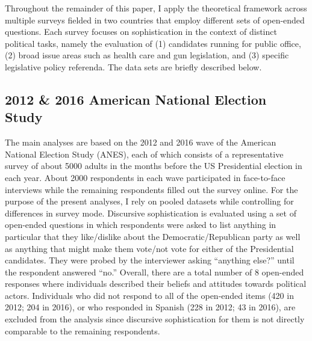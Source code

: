 Throughout the remainder of this paper, I apply the theoretical framework across multiple surveys fielded in two countries that employ different sets of open-ended questions. Each survey focuses on sophistication in the context of distinct political tasks, namely the evaluation of (1) candidates running for public office, (2) broad issue areas such as health care and gun legislation, and (3) specific legislative policy referenda. The data sets are briefly described below.


\subsection*{2012 \& 2016 American National Election Study}
The main analyses are based on the 2012 and 2016 wave of the American National Election Study (ANES), each of which consists of a representative survey of about 5000 adults in the months before the US Presidential election in each year. About 2000 respondents in each wave participated in face-to-face interviews while the remaining respondents filled out the survey online. For the purpose of the present analyses, I rely on pooled datasets while controlling for differences in survey mode. Discursive sophistication is evaluated using a set of open-ended questions in which respondents were asked to list anything in particular that they like/dislike about the Democratic/Republican party as well as anything that might make them vote/not vote for either of the Presidential candidates. They were probed by the interviewer asking ``anything else?'' until the respondent answered ``no.'' Overall, there are a total number of 8 open-ended responses where individuals described their beliefs and attitudes towards political actors. Individuals who did not respond to all of the open-ended items (420 in 2012; 204 in 2016), or who responded in Spanish (228 in 2012; 43 in 2016), are excluded from the analysis since discursive sophistication for them is not directly comparable to the remaining respondents.


